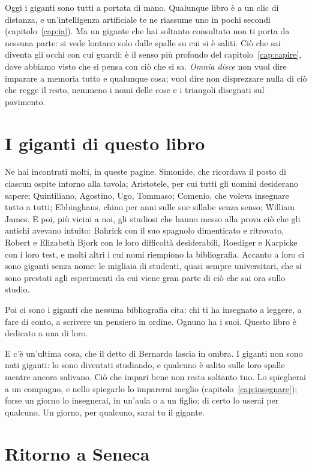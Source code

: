 Oggi i giganti sono tutti a portata di mano. Qualunque libro è a un
clic di distanza, e un'intelligenza artificiale te ne riassume uno in
pochi secondi (capitolo~\ref{cap:ia}). Ma un gigante che hai soltanto
consultato non ti porta da nessuna parte: si vede lontano solo dalle
spalle su cui si è saliti. Ciò che sai diventa gli occhi con cui
guardi: è il senso più profondo del capitolo~\ref{cap:capire}, dove
abbiamo visto che si pensa con ciò che si sa. \emph{Omnia disce} non
vuol dire imparare a memoria tutto e qualunque cosa; vuol dire non
disprezzare nulla di ciò che regge il resto, nemmeno i nomi delle cose
e i triangoli disegnati sul pavimento.

\section*{I giganti di questo libro}

Ne hai incontrati molti, in queste pagine. Simonide, che ricordava il
posto di ciascun ospite intorno alla tavola; Aristotele, per cui tutti
gli uomini desiderano sapere; Quintiliano, Agostino, Ugo, Tommaso;
Comenio, che voleva insegnare tutto a tutti; Ebbinghaus, chino per anni
sulle sue sillabe senza senso; William James. E poi, più vicini a noi,
gli studiosi che hanno messo alla prova ciò che gli antichi avevano
intuito: Bahrick con il suo spagnolo dimenticato e ritrovato, Robert e
Elizabeth Bjork con le loro difficoltà desiderabili, Roediger e
Karpicke con i loro test, e molti altri i cui nomi riempiono la
bibliografia. Accanto a loro ci sono giganti senza nome: le migliaia di
studenti, quasi sempre universitari, che si sono prestati agli
esperimenti da cui viene gran parte di ciò che sai ora sullo studio.

Poi ci sono i giganti che nessuna bibliografia cita: chi ti ha
insegnato a leggere, a fare di conto, a scrivere un pensiero in ordine.
Ognuno ha i suoi. Questo libro è dedicato a una di loro.

E c'è un'ultima cosa, che il detto di Bernardo lascia in ombra. I
giganti non sono nati giganti: lo sono diventati studiando, e qualcuno
è salito sulle loro spalle mentre ancora salivano. Ciò che impari bene
non resta soltanto tuo. Lo spiegherai a un compagno, e nello spiegarlo
lo imparerai meglio (capitolo~\ref{cap:insegnare}); forse un giorno lo
insegnerai, in un'aula o a un figlio; di certo lo userai per qualcuno.
Un giorno, per qualcuno, sarai tu il gigante.

\section*{Ritorno a Seneca}

